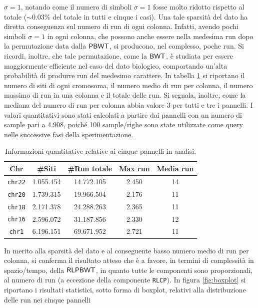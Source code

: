 $\sigma=1$, notando come il numero di simboli $\sigma=1$ fosse molto ridotto
rispetto al totale ($\sim 0.03\%$ del totale in tutti e
cinque i casi). Una tale
sparsità del dato ha diretta conseguenza sul numero di run di ogni
colonna. Infatti, avendo 
pochi simboli $\sigma=1$ in ogni colonna, che possono anche
essere nella medesima run dopo la permutazione data dalla
$\mbox{\rm {\sf PBWT}}$, si producono, nel complesso, poche run. Si ricordi, inoltre, che tale
permutazione, come la 
$\mbox{\rm {\sf BWT}}$, è studiata per essere 
maggiormente efficiente nel caso del dato biologico, comportando un'alta
probabilità di produrre run del medesimo carattere. In tabella \ref{tab:panel}
si riportano il numero di siti di ogni cromosoma, il 
numero medio di run per colonna, il numero 
massimo di run in una colonna e il totale delle run. Si segnala, inoltre,
come la
mediana del numero di run per colonna abbia valore 3 per tutti e tre i pannelli.
I valori quantitativi sono 
stati calcolati a partire dai pannelli con un numero di sample pari a 4.908,
poiché 100 sample/righe sono state utilizzate come query nelle successive
fasi della sperimentazione.
\begin{table}
  \centering
  \caption{Informazioni quantitative relative ai cinque pannelli in analisi.}
  \label{tab:panel}
  \vspace{-2mm}
  \begin{tabular}{c||c|c|c|c}
    \textbf{Chr} & \textbf{\#Siti} & \textbf{\#Run totale}
    & \textbf{Max run} & \textbf{Media run} \\ 
    \hline
    \texttt{chr22} & 1.055.454 & 14.772.105 & 2.450 & 14\\
    \texttt{chr20} & 1.739.315 & 19.966.504 & 2.176 & 11\\
    \texttt{chr18} & 2.171.378 & 24.288.263 & 2.365 & 11\\
    \texttt{chr16} & 2.596.072 & 31.187.856 & 2.330 & 12\\
    \texttt{chr1} & 6.196.151 & 69.671.952 & 2.721 & 11\\
  \end{tabular}
\end{table}
In merito alla sparsità del dato e al
conseguente basso numero medio di run per colonna, si conferma il risultato
atteso che è a favore, in termini di 
complessità in spazio/tempo, della $\mbox{\rm {\sf RLPBWT}}$, in quanto tutte le componenti sono
proporzionali, al numero di run (a eccezione della componente \texttt{RLCP}). In
figura 
\ref{fig:boxplot} si riportano i risultati statistici, sotto forma di
boxplot, relativi alla distribuzione delle run nei cinque pannelli
